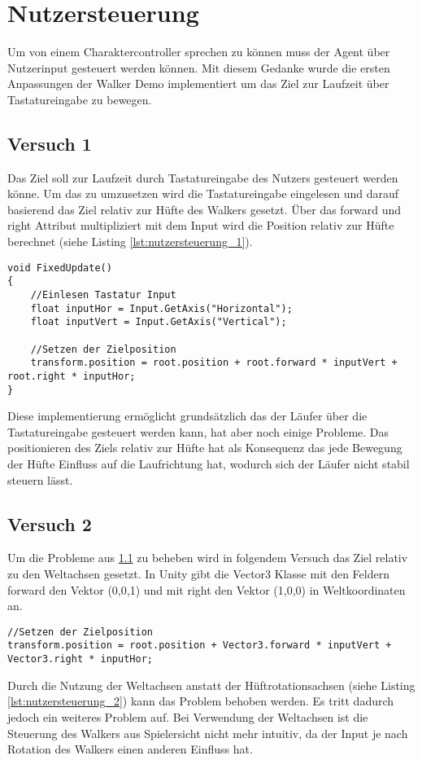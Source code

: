 \section{Nutzersteuerung}
Um von einem Charaktercontroller sprechen zu können muss der Agent über Nutzerinput gesteuert werden können. Mit diesem Gedanke wurde die ersten Anpassungen der Walker Demo implementiert um das Ziel zur Laufzeit über Tastatureingabe zu bewegen.

\subsection{Versuch 1}
\label{subsec:versuch_1}
Das Ziel soll zur Laufzeit durch Tastatureingabe des Nutzers gesteuert werden könne.
Um das zu umzusetzen wird die Tastatureingabe eingelesen und darauf basierend das Ziel relativ zur Hüfte des Walkers gesetzt. Über das forward und right Attribut multipliziert mit dem Input wird die Position relativ zur Hüfte berechnet (siehe Listing \ref{lst:nutzersteuerung_1}).
\begin{lstlisting}[caption={Nutzersteuerung erster Prototyp},captionpos=b,label={lst:nutzersteuerung_1}]
void FixedUpdate()
{
    //Einlesen Tastatur Input
    float inputHor = Input.GetAxis("Horizontal");
    float inputVert = Input.GetAxis("Vertical");
        
    //Setzen der Zielposition
    transform.position = root.position + root.forward * inputVert + root.right * inputHor;
}
\end{lstlisting}
Diese implementierung ermöglicht grundsätzlich das der Läufer über die Tastatureingabe gesteuert werden kann, hat aber noch einige Probleme. Das positionieren des Ziels relativ zur Hüfte hat als Konsequenz das jede Bewegung der Hüfte Einfluss auf die Laufrichtung hat, wodurch sich der Läufer nicht stabil steuern lässt. 

\subsection{Versuch 2}
Um die Probleme aus \ref{subsec:versuch_1} zu beheben wird in folgendem Versuch das Ziel relativ zu den Weltachsen gesetzt. In Unity gibt die Vector3 Klasse mit den Feldern forward den Vektor (0,0,1) und mit right den Vektor (1,0,0) in Weltkoordinaten an.
\begin{lstlisting}[caption={Nutzersteuerung berechnung mit Weltachsen},captionpos=b,label={lst:nutzersteuerung_2}]
//Setzen der Zielposition
transform.position = root.position + Vector3.forward * inputVert + Vector3.right * inputHor;
\end{lstlisting}
Durch die Nutzung der Weltachsen anstatt der Hüftrotationsachsen (siehe Listing \ref{lst:nutzersteuerung_2}) kann das Problem behoben werden. Es tritt dadurch jedoch ein weiteres Problem auf. Bei Verwendung der Weltachsen ist die Steuerung des Walkers aus Spielersicht nicht mehr intuitiv, da der Input je nach Rotation des Walkers einen anderen Einfluss hat.

